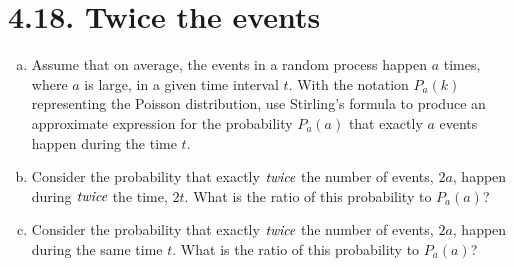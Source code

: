 \section*{4.18. Twice the events}
\begin{enumerate}[(a)]
    \item Assume that on average, the events in a random process happen $a$ times,
        where $a$ is large, in a given time interval $t$. With the notation
        $P_a(k)$ representing the Poisson distribution, use Stirling's formula
        to produce an approximate expression for the probability $P_a(a)$ that
        exactly $a$ events happen during the time $t$.

    \item Consider the probability that exactly $\emph{twice}$ the number of events,
        $2a$, happen during $\emph{twice}$ the time, $2t$. What is the ratio
        of this probability to $P_a(a)$?

    \item Consider the probability that exactly $\emph{twice}$ the number of events,
        $2a$, happen during the same time $t$. What is the ratio
        of this probability to $P_a(a)$?
\end{enumerate}

\vspace{1em}

